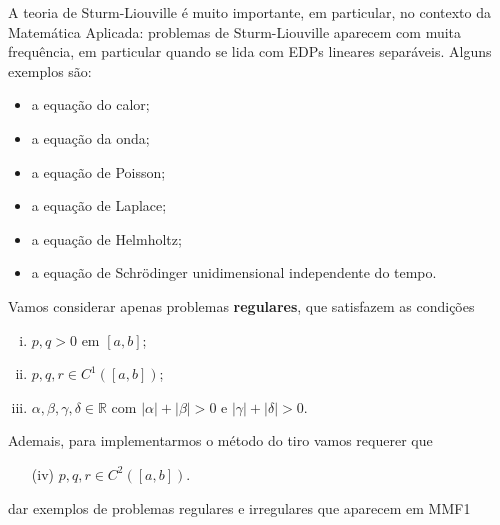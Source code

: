 \documentclass[twocolumn,showpacs,%
  nofootinbib,aps,superscriptaddress,%
  eqsecnum,prd,notitlepage,showkeys,10pt]{revtex4-1}
\newcommand{\R}{\mathbb{R}}
\begin{document}
A teoria de Sturm-Liouville é muito importante, em particular, no contexto
da Matemática Aplicada: problemas de Sturm-Liouville aparecem com muita
frequência, em particular quando se lida com EDPs lineares separáveis.
Alguns exemplos são:
%
\begin{itemize}
    \item a equação do calor;
    \item a equação da onda;
    \item a equação de Poisson;
    \item a equação de Laplace;
    \item a equação de Helmholtz;
    \item a equação de Schrödinger unidimensional independente do tempo.
\end{itemize}
%
Vamos considerar apenas problemas \textbf{regulares}, que satisfazem as condições
%
\begin{enumerate}[(i)]
    \item $p, q > 0$ em $[a,b]$;
    \item $p, q, r\in C^1([a,b])$;
    \item $\alpha, \beta, \gamma, \delta \in\R$ com $|\alpha| + |\beta| > 0$
    e $|\gamma| + |\delta| > 0$.
\end{enumerate}
%
Ademais, para implementarmos o método do tiro vamos requerer que
%
\begin{itemize}
    \item[(iv)] $p, q, r\in C^2([a,b])$.
\end{itemize}
%

dar exemplos de problemas regulares e irregulares que aparecem em MMF1
\end{document}
